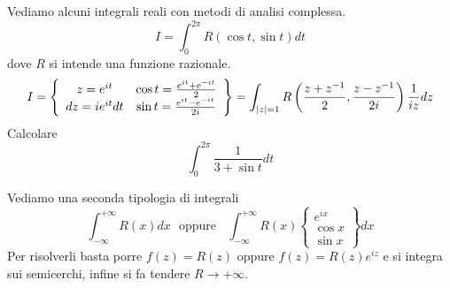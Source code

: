 Vediamo alcuni integrali reali con metodi di analisi complessa.
\begin{equation*}
I = \boxed{\int ^{2\pi }_{0} R\left(\cos t,\sin t\right) dt}
\end{equation*}
dove $R$ si intende una funzione razionale.
\begin{equation*}
I = \left\{\begin{array}{ c c }
z = e^{it} & \cos t = \frac{e^{it} + e^{ - it}}{2}\\
dz = ie^{it} dt & \sin t = \frac{e^{it} - e^{ - it}}{2i}
\end{array}\right\} = \int _{\left| z\right| = 1} R\left(\frac{z + z^{ - 1}}{2} ,\frac{z - z^{ - 1}}{2i}\right)\frac{1}{iz} dz
\end{equation*}
Calcolare
\begin{equation*}
\int ^{2\pi }_{0}\frac{1}{3 + \sin t} dt
\end{equation*}
\Esercizio{}

Vediamo una seconda tipologia di integrali
\begin{equation*}
\boxed{\int ^{ + \infty }_{ - \infty } R\left(x\right) dx} \ \ \ \text{oppure} \ \ \ \ \boxed{\int ^{ + \infty }_{ - \infty } R\left(x\right)\left\{\begin{array}{ c }
e^{ix}\\
\cos x\\
\sin x
\end{array}\right\} dx}
\end{equation*}
Per risolverli basta porre $f\left(z\right) = R\left(z\right)$ oppure $f\left(z\right) = R\left(z\right) e^{iz}$ e si integra sui semicerchi, infine si fa tendere $R\rightarrow + \infty $.


